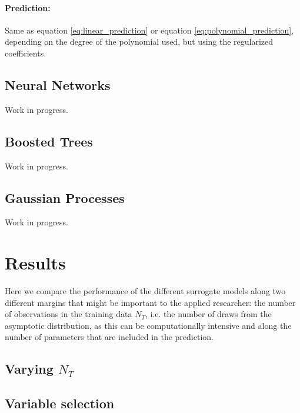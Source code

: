 \documentclass[a4paper, 12pt]{article}
\begin{document}
\paragraph{Prediction:} Same as equation \ref{eq:linear_prediction} or equation \ref{eq:polynomial_prediction}, depending on the degree of the polynomial used, but using the regularized coefficients.

\subsection{Neural Networks}
Work in progress.

\subsection{Boosted Trees}
Work in progress.

\subsection{Gaussian Processes}
Work in progress.


\section{Results}

Here we compare the performance of the different surrogate models along two different margins that might be important to the applied researcher: the number of observations in the training data $N_{T}$, i.e. the number of draws from the asymptotic distribution, as this can be computationally intensive and along the number of parameters that are included in the prediction. 


\subsection{Varying $N_{T}$}




\subsection{Variable selection}


\end{document}
